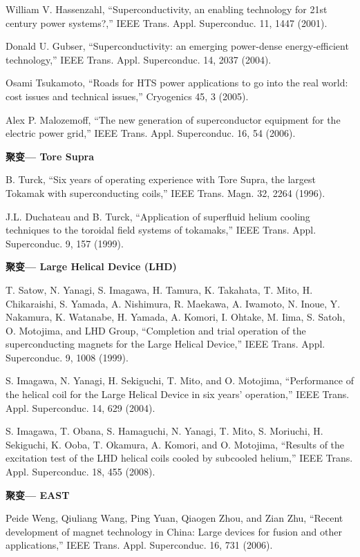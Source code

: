 \noindent [9.26] William V. Hassenzahl, ``Superconductivity, an enabling technology for 21st century
power systems?,” IEEE Trans. Appl. Superconduc. 11, 1447 (2001).

\noindent [9.27] Donald U. Gubser, ``Superconductivity: an emerging power-dense energy-efficient
technology,” IEEE Trans. Appl. Superconduc. 14, 2037 (2004).

\noindent [9.28] Osami Tsukamoto, ``Roads for HTS power applications to go into the real world:
cost issues and technical issues,” Cryogenics 45, 3 (2005).

\noindent [9.29] Alex P. Malozemoff, ``The new generation of superconductor equipment for the
electric power grid,” IEEE Trans. Appl. Superconduc. 16, 54 (2006).

\noindent \textbf{聚变--- Tore Supra }

\noindent [9.30] B. Turck, ``Six years of operating experience with Tore Supra, the largest Tokamak
with superconducting coils,” IEEE Trans. Magn. 32, 2264 (1996).

\noindent [9.31] J.L. Duchateau and B. Turck, ``Application of superfluid helium cooling techniques
to the toroidal field systems of tokamaks,” IEEE Trans. Appl. Superconduc. 9, 157
(1999).

\noindent \textbf{聚变--- Large Helical Device (LHD) }

\noindent [9.32] T. Satow, N. Yanagi, S. Imagawa, H. Tamura, K. Takahata, T. Mito, H. Chikaraishi,
S. Yamada, A. Nishimura, R. Maekawa, A. Iwamoto, N. Inoue, Y. Nakamura,
K. Watanabe, H. Yamada, A. Komori, I. Ohtake, M. Iima, S. Satoh, O. Motojima,
and LHD Group, ``Completion and trial operation of the superconducting magnets
for the Large Helical Device,” IEEE Trans. Appl. Superconduc. 9, 1008 (1999).

\noindent [9.33] S. Imagawa, N. Yanagi, H. Sekiguchi, T. Mito, and O. Motojima, ``Performance of
the helical coil for the Large Helical Device in six years’ operation,” IEEE Trans.
Appl. Superconduc. 14, 629 (2004).

\noindent [9.34] S. Imagawa, T. Obana, S. Hamaguchi, N. Yanagi, T. Mito, S. Moriuchi, H. Sekiguchi,
K. Ooba, T. Okamura, A. Komori, and O. Motojima, ``Results of the excitation
test of the LHD helical coils cooled by subcooled helium,” IEEE Trans.
Appl. Superconduc. 18, 455 (2008).

\noindent \textbf{聚变--- EAST}

\noindent [9.35] Peide Weng, Qiuliang Wang, Ping Yuan, Qiaogen Zhou, and Zian Zhu, ``Recent development of magnet technology in China: Large devices for fusion and other applications,” IEEE Trans. Appl. Superconduc. 16, 731 (2006).


